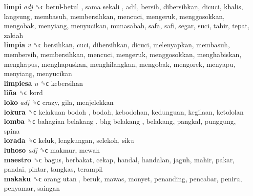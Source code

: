 \textbf{limpi} \emph{adj}  ␝ϲ   betul-betul ,  sama sekali , adil, bersih, dibersihkan, dicuci, khalis, langsung, membasuh, membersihkan, mencuci, mengeruk, menggosokkan, mengobak, menyiang, menyucikan, munasabah, safa, safi, segar, suci, tahir, tepat, zakiah  \\
\textbf{limpia} \emph{v}  ␝ϲ  bersihkan, cuci, dibersihkan, dicuci, melenyapkan, membasuh, membersih, membersihkan, mencuci, mengeruk, menggosokkan, menghabiskan, menghapus, menghapuskan, menghilangkan, mengobak, mengorek, menyapu, menyiang, menyucikan  \\
\textbf{limpiesa} \emph{n}  ␝ϲ  kebersihan  \\
\textbf{liña} ␝ϲ  kord  \\
\textbf{loko} \emph{adj}  ␝ϲ  crazy, gila, menjelekkan  \\
\textbf{lokura} ␝ϲ   kelakuan bodoh , bodoh, kebodohan, kedunguan, kegilaan, ketololan  \\
\textbf{lomba} ␝ϲ   bahagian belakang ,  bhg belakang , belakang, pangkal, punggung, spina  \\
\textbf{lorada} ␝ϲ  keluk, lengkungan, selekoh, siku  \\
\textbf{luhoso} \emph{adj}  ␝ϲ  makmur, mewah  \\
\textbf{maestro} ␝ϲ  bagus, berbakat, cekap, handal, handalan, jaguh, mahir, pakar, pandai, pintar, tangkas, terampil  \\
\textbf{makaku} ␝ϲ   orang utan , beruk, mawas, monyet, penanding, pencabar, peniru, penyamar, saingan  \\
